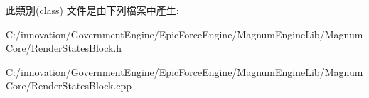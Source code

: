 此類別(class) 文件是由下列檔案中產生\+:\begin{DoxyCompactItemize}
\item 
C\+:/innovation/\+Government\+Engine/\+Epic\+Force\+Engine/\+Magnum\+Engine\+Lib/\+Magnum\+Core/Render\+States\+Block.\+h\item 
C\+:/innovation/\+Government\+Engine/\+Epic\+Force\+Engine/\+Magnum\+Engine\+Lib/\+Magnum\+Core/Render\+States\+Block.\+cpp\end{DoxyCompactItemize}
